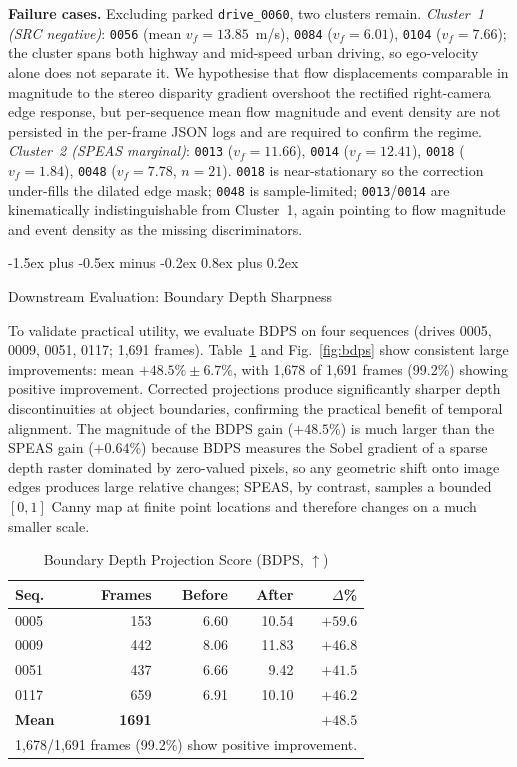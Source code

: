 \documentclass[conference]{IEEEtran}
\makeatletter
\def\subsection{\@startsection{subsection}{2}{\z@}
  {-1.5ex plus -0.5ex minus -0.2ex}
  {0.8ex plus 0.2ex}
  {\normalfont\normalsize\bfseries\raggedright}}
\makeatother
\begin{document}
\textbf{Failure cases.} Excluding parked \texttt{drive\_0060},
two clusters remain. \emph{Cluster~1 (SRC negative)}:
\texttt{0056} (mean $v_f{=}13.85$~m/s), \texttt{0084}
($v_f{=}6.01$), \texttt{0104} ($v_f{=}7.66$); the cluster spans
both highway and mid-speed urban driving, so ego-velocity alone
does not separate it. We hypothesise that flow displacements
comparable in magnitude to the stereo disparity gradient
overshoot the rectified right-camera edge response, but
per-sequence mean flow magnitude and event density are not
persisted in the per-frame JSON logs and are required to
confirm the regime.
\emph{Cluster~2 (SPEAS marginal)}: \texttt{0013}
($v_f{=}11.66$), \texttt{0014} ($v_f{=}12.41$), \texttt{0018}
($v_f{=}1.84$), \texttt{0048} ($v_f{=}7.78$, $n{=}21$).
\texttt{0018} is near-stationary so the correction under-fills
the dilated edge mask; \texttt{0048} is sample-limited;
\texttt{0013}/\texttt{0014} are kinematically indistinguishable
from Cluster~1, again pointing to flow magnitude and event
density as the missing discriminators.

\FloatBarrier

\subsection{Downstream Evaluation: Boundary Depth Sharpness}

To validate practical utility, we evaluate BDPS on four
sequences (drives 0005, 0009, 0051, 0117; 1{,}691 frames).
Table~\ref{tab:bdps} and Fig.~\ref{fig:bdps} show consistent
large improvements: mean $+48.5\%{\pm}6.7\%$, with 1{,}678
of 1{,}691 frames (99.2\%) showing positive improvement.
Corrected projections produce significantly sharper depth
discontinuities at object boundaries, confirming the practical
benefit of temporal alignment. The magnitude of the BDPS gain
($+48.5\%$) is much larger than the SPEAS gain ($+0.64\%$)
because BDPS measures the Sobel gradient of a sparse depth
raster dominated by zero-valued pixels, so any geometric shift
onto image edges produces large relative changes; SPEAS, by
contrast, samples a bounded $[0,1]$ Canny map at finite point
locations and therefore changes on a much smaller scale.

\begin{table}[t]
\centering
\caption{Boundary Depth Projection Score (BDPS, $\uparrow$)}
\label{tab:bdps}
\setlength{\tabcolsep}{4pt}
\begin{tabular}{lrrrr}
\toprule
Seq. & Frames & Before & After & $\Delta$\% \\
\midrule
0005 &  153 & 6.60 & 10.54 & $+59.6$ \\
0009 &  442 & 8.06 & 11.83 & $+46.8$ \\
0051 &  437 & 6.66 &  9.42 & $+41.5$ \\
0117 &  659 & 6.91 & 10.10 & $+46.2$ \\
\midrule
\textbf{Mean} & \textbf{1691} & & & $\mathbf{+48.5}$ \\
\bottomrule
\multicolumn{5}{l}{\footnotesize 1{,}678/1{,}691 frames (99.2\%)
  show positive improvement.} \\
\end{tabular}
\end{table}
\end{document}
